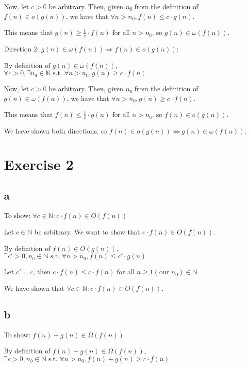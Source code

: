\documentclass[a4paper,12pt]{article}
\begin{document}
Now, let $c > 0$ be arbitrary. Then, given $n_0$ from the definition of $f(n) \in o(g(n))$, we have that $\forall n > n_0, f(n) \leq c \cdot g(n)$.

This means that $g(n) \geq \frac{1}{c} \cdot f(n)$ for all $n > n_0$, so $g(n) \in \omega(f(n))$.

Direction 2: $g(n) \in \omega(f(n)) \Rightarrow f(n) \in o(g(n))$:

By definition of $g(n) \in \omega(f(n))$, $\forall c > 0, \exists n_0 \in \mathbb{N} \text{ s.t. } \forall n > n_0, g(n) \geq c \cdot f(n)$

Now, let $c > 0$ be arbitrary. Then, given $n_0$ from the definition of $g(n) \in \omega(f(n))$, we have that $\forall n > n_0, g(n) \geq c \cdot f(n)$.

This means that $f(n) \leq \frac{1}{c} \cdot g(n)$ for all $n > n_0$, so $f(n) \in o(g(n))$.

We have shown both directions, so $f(n) \in o(g(n)) \Leftrightarrow g(n) \in \omega(f(n))$.

\section{Exercise 2}

\subsection{a}

To show: $\forall c \in \mathbb{N} : c \cdot f(n) \in O(f(n))$

Let $c \in \mathbb{N}$ be arbitrary. We want to show that $c \cdot f(n) \in O(f(n))$.

By definition of $f(n) \in O(g(n))$, $\exists c' > 0, n_0 \in \mathbb{N} \text{ s.t. } \forall n > n_0, f(n) \leq c' \cdot g(n)$

Let $c' = c$, then $c \cdot f(n) \leq c \cdot f(n)$ for all $n \geq 1 (\text{our } n_0)\in \mathbb{N}$

We have shown that $\forall c \in \mathbb{N} : c \cdot f(n) \in O(f(n))$.

\subsection{b}

To show: $f(n) + g(n) \in \Omega(f(n))$

By definition of $f(n) + g(n) \in \Omega(f(n))$, $\exists c > 0, n_0 \in \mathbb{N} \text{ s.t. } \forall n > n_0, f(n) + g(n) \geq c \cdot f(n)$
\end{document}
